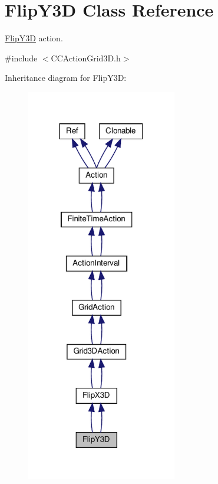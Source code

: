 \hypertarget{classFlipY3D}{}\section{Flip\+Y3D Class Reference}
\label{classFlipY3D}


\hyperlink{classFlipY3D}{Flip\+Y3D} action.  




{\ttfamily \#include $<$C\+C\+Action\+Grid3\+D.\+h$>$}



Inheritance diagram for Flip\+Y3D\+:
\nopagebreak
\begin{figure}[H]
\begin{center}
\leavevmode
\includegraphics[width=186pt]{classFlipY3D__inherit__graph}
\end{center}
\end{figure}


